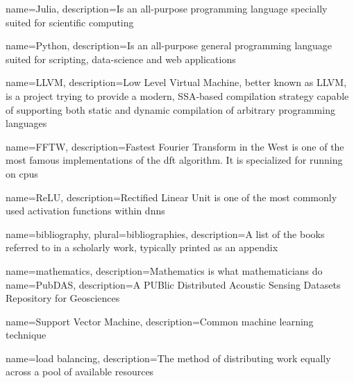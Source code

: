 

\makeglossaries %

{
        name=Julia,
        description={Is an all-purpose programming language specially suited for
scientific computing}
}

{
        name=Python,
        description={Is an all-purpose general programming language suited for scripting, data-science and web applications}
}

{
        name=LLVM,
        description={Low Level Virtual Machine, better known as LLVM, is a project trying to provide a modern, SSA-based compilation strategy capable of supporting both static and dynamic compilation of arbitrary programming languages \cite{llvm}}
}

{
        name=FFTW,
        description={Fastest Fourier Transform in the West is one of the most famous implementations of the \acrshort{dft} algorithm. It is specialized for running on \acrlong{cpu}s}
}

{
    name=ReLU,
    description={Rectified Linear Unit is one of the most commonly used activation functions within \acrshort{dnn}s}
}

{
        name=bibliography,
        plural=bibliographies,
        description={A list of the books referred to in a scholarly work,
typically printed as an appendix}
}

{
    name=mathematics,
    description={Mathematics is what mathematicians do}
}
{
    name=PubDAS,
    description={A PUBlic Distributed Acoustic Sensing Datasets Repository for Geosciences}
}


{
    name=Support Vector Machine,
    description={Common machine learning technique}
}

{
    name=load balancing,
    description={The method of distributing work equally across a pool of available resources}
}




